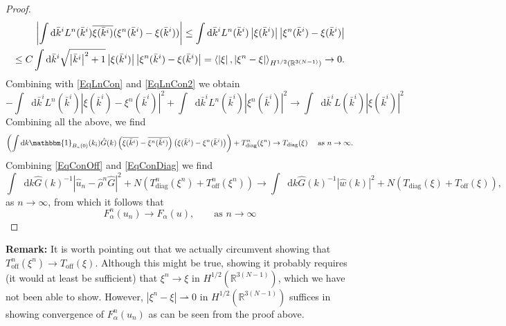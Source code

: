 \documentclass[a4paper,11pt]{article}
\newcommand{\abs}[1]{\left\lvert #1 \right\rvert}
\newcommand*\diff{\mathop{}\!\mathrm{d}}
\newcommand{\R}{\mathbb{R}}
\numberwithin{equation}{section}
\begin{document}
\begin{proof}
\begin{equation}
\begin{aligned}
\abs{\int\diff \bar{k}^i L^n(\bar{k}^i)\overline{\xi(\bar{k}^i)}(\xi^n(\bar{k}^i)-\xi(\bar{k}^i))}\leq\int\diff \bar{k}^i L^n(\bar{k}^i)\abs{\xi(\bar{k}^i)}\abs{\xi^n(\bar{k}^i)-\xi(\bar{k}^i)}\\\leq C\int\diff \bar{k}^i\sqrt{\abs{\bar{k}^i}^2+1}\abs{\xi(\bar{k}^i)}\abs{\xi^n(\bar{k}^i)-\xi(\bar{k}^i)}=\braket{\abs{\xi},\abs{\xi^n-\xi}}_{H^{1/2}(\R^{3(N-1)})}\to0.
\end{aligned}
\end{equation}
Combining with \eqref{EqLnCon} and \eqref{EqLnCon2} we obtain \begin{equation}
-\int\diff\bar{k}^iL^n(\bar{k}^i)\left\lvert\xi(\bar{k}^i)-\xi^n(\bar{k}^i)\right\rvert^2+\int\diff \bar{k}^i L^n(\bar{k}^i)\abs{\xi^n(\bar{k}^i)}^2\to\int\diff \bar{k}^i L(\bar{k}^i)\abs{\xi(\bar{k}^i)}^2
\end{equation}
Combining all the above, we find \begin{equation}\label{EqConDiag}
\left(\int\diff k\mathbbm{1}_{B_n(0)}(k_i)\hat{G}(k)\left(\overline{\xi(\bar{k}^i)}-\overline{\xi^n(\bar{k}^i)}\right)\left(\xi(\bar{k}^i)-\xi^n(\bar{k}^i)\right)\right)+T_{\text{diag}}^n(\xi^n)\to T_{\text{diag}}(\xi)\quad\text{ as }n\to\infty.
\end{equation}
Combining \eqref{EqConOff} and \eqref{EqConDiag} we find \begin{equation}
\int\diff k \hat{G}(k)^{-1}\abs{\hat{u}_n-\hat{\rho}^n\hat{G}}^2+N(T_{\text{diag}}^n(\xi^n)+T_{\text{off}}^n(\xi^n))\to \int\diff k \hat{G}(k)^{-1}\abs{\hat{w}(k)}^2+N(T_{\text{diag}}(\xi)+T_{\text{off}}(\xi)),
\end{equation}
as $ n\to\infty $, from which it follows that \begin{equation}
F^n_\alpha(u_n)\to F_\alpha(u),\qquad\text{as }n\to\infty
\end{equation}
	\end{proof}
	\textbf{Remark:} It is worth pointing out that we actually circumvent showing that $ T^n_{\text{off}}(\xi^n)\to T_{\text{off}}(\xi) $. Although this might be true, showing it probably requires (it would at least be sufficient) that $ \xi^n\to\xi $ in $ H^{1/2}(\R^{3(N-1)}) $, which we have not been able to show. However, $ \abs{\xi^n-\xi}\rightharpoonup0 $ in $ H^{1/2}(\R^{3(N-1)}) $ suffices in showing convergence of $ F_\alpha^n(u_n) $ as can be seen from the proof above.\\
\end{document}
